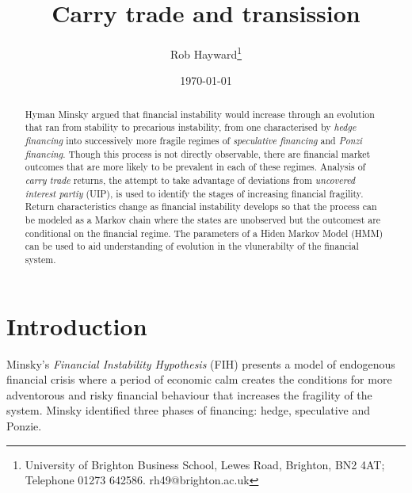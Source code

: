 \documentclass[12pt, a4paper, oneside]{article} %
\begin{document}
\title{Carry trade and transission}
\author{Rob Hayward\footnote{University of Brighton Business School, Lewes Road, Brighton, BN2 4AT; Telephone 01273 642586.  rh49@brighton.ac.uk}} 
\date{\today}
\maketitle
\begin{abstract}
Hyman Minsky argued that financial instability would increase through an evolution that ran from stability to precarious instability, from one characterised by \emph{hedge financing} into successively more fragile regimes of \emph{speculative financing} and \emph{Ponzi financing}.  Though this process is not directly observable, there are financial market outcomes that are more likely to be prevalent in each of these regimes.  Analysis of \emph{carry trade} returns, the attempt to take advantage of deviations from \emph{uncovered interest partiy} (UIP), is used to identify the stages of increasing financial fragility.  Return characteristics change as financial instability develops so that the process can be modeled as a Markov chain where the states are unobserved but the outcomest are conditional on  the financial regime.  The parameters of a Hiden Markov Model (HMM) can be used to aid understanding of evolution in the vlunerabilty of the financial system.  %

\end{abstract}

\section{Introduction}

Minsky's \emph{Financial Instability Hypothesis} (FIH) presents a model of endogenous financial crisis where a period of economic calm creates the conditions for more adventorous and risky financial behaviour that increases the fragility of the system.  Minsky identified three phases of financing:  hedge, speculative and Ponzie.  
\end{document}
